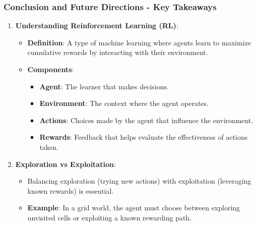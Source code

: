 \documentclass[aspectratio=169]{beamer}
\begin{document}
\begin{frame}[fragile]
    \frametitle{Conclusion and Future Directions - Key Takeaways}
    
    \begin{enumerate}
        \item \textbf{Understanding Reinforcement Learning (RL)}:
        \begin{itemize}
            \item \textbf{Definition}: A type of machine learning where agents learn to maximize cumulative rewards by interacting with their environment.
            \item \textbf{Components}:
            \begin{itemize}
                \item \textbf{Agent}: The learner that makes decisions.
                \item \textbf{Environment}: The context where the agent operates.
                \item \textbf{Actions}: Choices made by the agent that influence the environment.
                \item \textbf{Rewards}: Feedback that helps evaluate the effectiveness of actions taken.
            \end{itemize}
        \end{itemize}

        \item \textbf{Exploration vs Exploitation}:
        \begin{itemize}
            \item Balancing exploration (trying new actions) with exploitation (leveraging known rewards) is essential.
            \item \textbf{Example}: In a grid world, the agent must choose between exploring unvisited cells or exploiting a known rewarding path.
        \end{itemize}
    \end{enumerate}
\end{frame}
\end{document}
